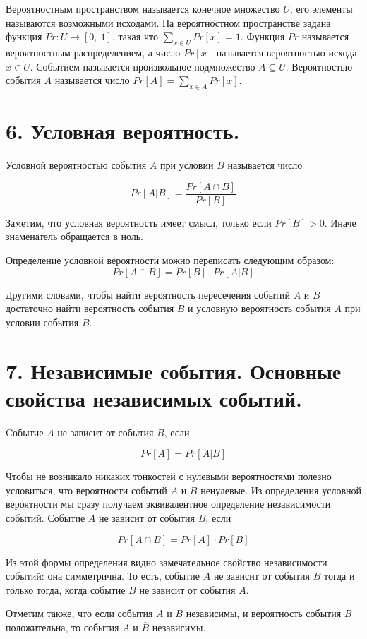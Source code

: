 \documentclass[a4paper, 12pt]{article}
\begin{document}
Вероятностным пространством называется конечное множество $U$, его элементы называются возможными исходами. На вероятностном пространстве задана функция $Pr: U \to [0,\ 1]$, такая что $\sum\limits_{x \in U} Pr[x] = 1$. Функция $Pr$ называется вероятностным распределением, а число $Pr[x]$ называется вероятностью исхода $x \in U$. Событием называется произвольное подмножество $A \subseteq U$. Вероятностью события $A$ называется число $Pr[A] = \sum\limits_{x \in A} Pr[x]$.


\section*{6. Условная вероятность.}

Условной вероятностью события $A$ при условии $B$ называется число

\[
    Pr[A|B] = \frac{Pr[A \cap B]}{Pr[B]}
\]

Заметим, что условная вероятность имеет смысл, только если $Pr[B] > 0$. Иначе знаменатель обращается в ноль.

Определение условной вероятности можно переписать следующим образом:
\[
    Pr[A \cap B] = Pr[B] \cdot Pr[A|B]
\]

Другими словами, чтобы найти вероятность пересечения событий $A$ и $B$ достаточно найти вероятность события $B$ и условную вероятность события $A$ при условии события $B$.


\section*{7. Независимые события. Основные свойства независимых событий.}

Cобытие $A$ не зависит от события $B$, если

\[
    Pr[A] = Pr[A|B]
\]

Чтобы не возникало никаких тонкостей с нулевыми вероятностями полезно условиться, что вероятности событий $A$ и $B$ ненулевые.
Из определения условной вероятности мы сразу получаем эквивалентное определение независимости событий. Событие $A$ не зависит от события $B$, если 

\[
    Pr[A \cap B] = Pr[A] \cdot Pr[B]
\]

Из этой формы определения видно замечательное свойство независимости событий: она симметрична. То есть, событие $A$ не зависит от события $B$ тогда и только тогда, когда событие $B$ не зависит от события $A$.

Отметим также, что если события $A$ и $B$ независимы, и вероятность события $\overline{B}$ положительна, то события $A$ и $\overline{B}$ независимы.
\end{document}
